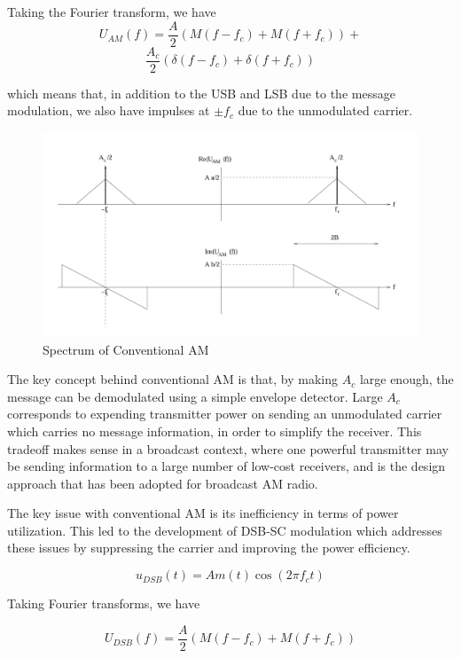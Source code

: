 \documentclass[conference]{IEEEtran}
\begin{document}
Taking the Fourier transform, we have 
\[ U_{AM}(f) = \frac{A}{2} \left( M(f - f_c) + M(f + f_c) \right) +\]
\[ \frac{A_c}{2} \left( \delta(f - f_c) + \delta(f + f_c) \right) \]

which means that, in addition to the USB and LSB due to the message modulation, we also have impulses at \( \pm f_c \) due to the unmodulated carrier.

\begin{figure}
    \centering
    \includegraphics[width=1\linewidth]{Conventional_AM_spectrum.png}
    \caption{Spectrum of Conventional AM}
\end{figure}

The key concept behind conventional AM is that, by making \( A_c \) large enough, the message can be demodulated using a simple envelope detector. Large \( A_c \) corresponds to expending transmitter power on sending an unmodulated carrier which carries no message information, in order to simplify the receiver. This tradeoff makes sense in a broadcast context, where one powerful transmitter may be sending information to a large number of low-cost receivers, and is the design approach that has been adopted for broadcast AM radio. 

The key issue with conventional AM is its inefficiency in terms of power utilization. This led to the development of DSB-SC modulation which addresses these issues by suppressing the carrier and improving the power efficiency. 

  \[  u_{DSB}(t) = A m(t) \cos(2\pi f_c t) \]


Taking Fourier transforms, we have

   \[ U_{DSB}(f) = \frac{A}{2} \left( M(f - f_c) + M(f + f_c) \right) \]
\end{document}
